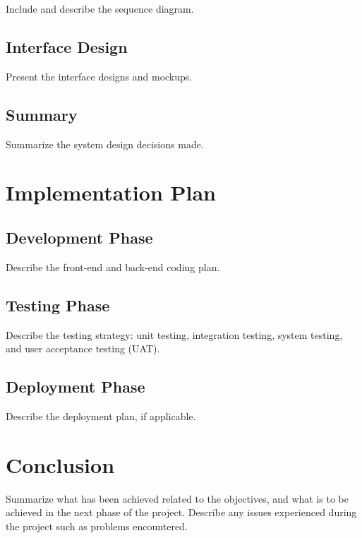 \documentclass[
]{fypStandard}
\begin{document}
Include and describe the sequence diagram.

\section{Interface Design}\label{interface-design}

Present the interface designs and mockups.

\section{Summary}\label{summary-2}

Summarize the system design decisions made.

\chapter{Implementation Plan}\label{implementation-plan}

\section{Development Phase}\label{development-phase}

Describe the front-end and back-end coding plan.

\section{Testing Phase}\label{testing-phase}

Describe the testing strategy: unit testing, integration testing, system
testing, and user acceptance testing (UAT).

\section{Deployment Phase}\label{deployment-phase}

Describe the deployment plan, if applicable.

\chapter{Conclusion}\label{conclusion}

Summarize what has been achieved related to the objectives, and what is
to be achieved in the next phase of the project. Describe any issues
experienced during the project such as problems encountered.

\newpage
\end{document}
